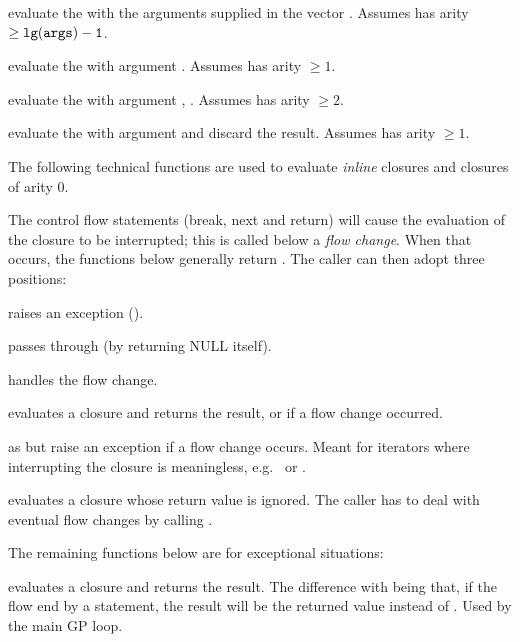  evaluate the 
 with the arguments supplied in the vector . Assumes 
has arity $\geq {\tt lg(args)-1}$.

 evaluate the 
 with argument . Assumes  has arity $\geq 1$.

 evaluate the 
 with argument , . Assumes  has arity $\geq 2$.

 evaluate the 
 with argument  and discard the result. Assumes 
has arity $\geq 1$.

The following technical functions are used to evaluate \emph{inline}
closures and closures of arity 0.

The control flow statements (break, next and return) will cause the
evaluation of the closure to be interrupted; this is called below a
\emph{flow change}. When that occurs, the functions below generally
 return . The caller can then adopt three positions:

\item raises an exception ().

\item passes through (by returning NULL itself).

\item handles the flow change.

 evaluates a closure and returns the result,
or  if a flow change occurred.

 as  but raise
an exception if a flow change occurs. Meant for iterators where
interrupting the closure is meaningless, e.g.~ or .

 evaluates a closure whose return
value is ignored. The caller has to deal with eventual flow changes by
calling .

The remaining functions below are for exceptional situations:

 evaluates a closure and returns the result.
The difference with  being that, if the flow end by a
 statement, the result will be the returned value instead of
. Used by the main GP loop.


